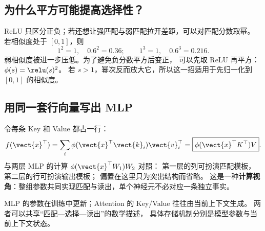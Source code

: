 \subsection{为什么平方可能提高选择性？}
ReLU 只区分正负；若还想让强匹配与弱匹配拉开差距，可以对匹配分数取幂。
若相似度处于 $[0,1]$，则
\[
1^2=1,\quad0.6^2=0.36;\qquad
1^3=1,\quad0.6^3=0.216.
\]
弱相似度被进一步压低。为了避免负分数平方后变正，
可以先取 ReLU 再平方：$\phi(s)=\relu(s)^2$。
若 $s>1$，幂次反而放大它，所以这一招适用于先归一化到 $[0,1]$ 的相似度。

\subsection{用同一套行向量写出 MLP}
令每条 Key 和 Value 都占一行：
\[
f(\vect{x}^\top)=\sum_i\phi(\vect{x}^\top\vect{k}_i)\vect{v}_i^\top
=\boxed{\phi(\vect{x}^\top K^\top)V}.
\]
与两层 MLP 的计算
$\phi(\vect{x}^\top W_1)W_2$ 对照：
第一层的列可扮演匹配模板，第二层的行可扮演输出模板；
偏置在这里只为突出结构而省略。
这是一种\textbf{计算视角}：整组参数共同实现匹配与读出，单个神经元不必对应一条独立事实。

\begin{idea}
MLP 的参数在训练中更新；Attention 的 Key/Value 往往由当前上下文生成。
两者可以共享“匹配—选择—读出”的数学描述，
具体存储机制分别是模型参数与当前上下文状态。
\end{idea}


